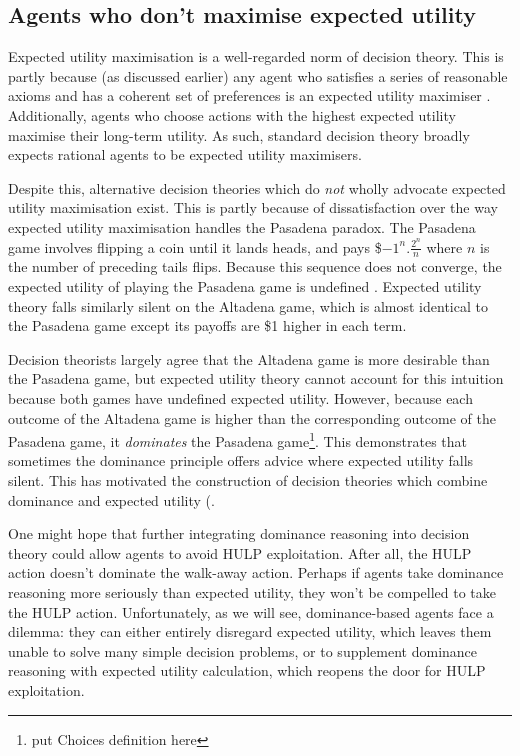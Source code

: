 \documentclass{article}
\begin{document}
\subsection{Agents who don't maximise expected utility}

Expected utility maximisation is a well-regarded norm of decision theory. This is partly because (as discussed earlier) any agent who satisfies a series of reasonable axioms and has a coherent set of preferences is an expected utility maximiser \citep{von1944games}. Additionally, agents who choose actions with the highest expected utility maximise their long-term utility. As such, standard decision theory broadly expects rational agents to be expected utility maximisers.

Despite this, alternative decision theories which do \textit{not} wholly advocate expected utility maximisation exist. This is partly because of dissatisfaction over the way expected utility maximisation handles the Pasadena paradox. The Pasadena game involves flipping a coin until it lands heads, and pays \$\(-1^n.\frac{2^n}{n}\) where \(n\) is the number of preceding tails flips. Because this sequence does not converge, the expected utility of playing the Pasadena game is undefined \citep{nover2004vexing}. Expected utility theory falls similarly silent on the Altadena game, which is almost identical to the Pasadena game except its payoffs are \$1 higher in each term.

Decision theorists largely agree that the Altadena game is more desirable than the Pasadena game, but expected utility theory cannot account for this intuition because both games have undefined expected utility. However, because each outcome of the Altadena game is higher than the corresponding outcome of the Pasadena game, it \textit{dominates} the Pasadena game\footnote{put Choices definition here}. This demonstrates that sometimes the dominance principle offers advice where expected utility falls silent. This has motivated the construction of decision theories which combine dominance and expected utility (\citep{easwaran2009dominance, colyvan2008relative, colyvan2006no}.

One might hope that further integrating dominance reasoning into decision theory could allow agents to avoid HULP exploitation. After all, the HULP action doesn't dominate the walk-away action. Perhaps if agents take dominance reasoning more seriously than expected utility, they won't be compelled to take the HULP action. Unfortunately, as we will see, dominance-based agents face a dilemma: they can either entirely disregard expected utility, which leaves them unable to solve many simple decision problems, or to supplement dominance reasoning with expected utility calculation, which reopens the door for HULP exploitation.
\end{document}
